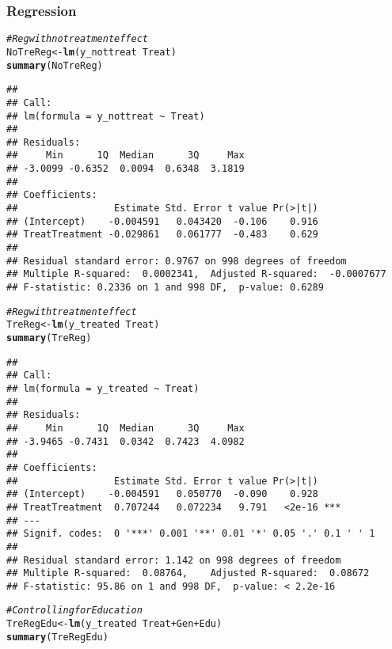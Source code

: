 \documentclass[11pt, a4paper]{article}\usepackage[]{graphicx}\usepackage[]{color}
\makeatletter
\newcommand{\hlcom}[1]{\textcolor[rgb]{0.678,0.584,0.686}{\textit{#1}}}%
\newcommand{\hlopt}[1]{\textcolor[rgb]{0,0,0}{#1}}%
\newcommand{\hlstd}[1]{\textcolor[rgb]{0.345,0.345,0.345}{#1}}%
\newcommand{\hlkwb}[1]{\textcolor[rgb]{0.69,0.353,0.396}{#1}}%
\newcommand{\hlkwd}[1]{\textcolor[rgb]{0.737,0.353,0.396}{\textbf{#1}}}%
\newenvironment{kframe}{%
 \def\at@end@of@kframe{}%
 \ifinner\ifhmode%
  \def\at@end@of@kframe{\end{minipage}}%
  \begin{minipage}{\columnwidth}%
 \fi\fi%
 \def\FrameCommand##1{\hskip\@totalleftmargin \hskip-\fboxsep
 \colorbox{shadecolor}{##1}\hskip-\fboxsep
     \hskip-\linewidth \hskip-\@totalleftmargin \hskip\columnwidth}%
 \MakeFramed {\advance\hsize-\width
   \@totalleftmargin\z@ \linewidth\hsize
   \@setminipage}}%
 {\par\unskip\endMakeFramed%
 \at@end@of@kframe}
\newenvironment{knitrout}{}{} %
\makeatother
\begin{document}
\clearpage

    \subsubsection{Regression}

\begin{knitrout}
\color{fgcolor}\begin{kframe}
\begin{alltt}
  \hlcom{#Reg with no treatment effect}
  \hlstd{NoTreReg} \hlkwb{<-} \hlkwd{lm}\hlstd{(y_nottreat} \hlopt{~} \hlstd{Treat)}
  \hlkwd{summary}\hlstd{(NoTreReg)}
\end{alltt}
\begin{verbatim}
## 
## Call:
## lm(formula = y_nottreat ~ Treat)
## 
## Residuals:
##     Min      1Q  Median      3Q     Max 
## -3.0099 -0.6352  0.0094  0.6348  3.1819 
## 
## Coefficients:
##                 Estimate Std. Error t value Pr(>|t|)
## (Intercept)    -0.004591   0.043420  -0.106    0.916
## TreatTreatment -0.029861   0.061777  -0.483    0.629
## 
## Residual standard error: 0.9767 on 998 degrees of freedom
## Multiple R-squared:  0.0002341,	Adjusted R-squared:  -0.0007677 
## F-statistic: 0.2336 on 1 and 998 DF,  p-value: 0.6289
\end{verbatim}
\begin{alltt}
  \hlcom{#Reg with treatment effect}
  \hlstd{TreReg} \hlkwb{<-} \hlkwd{lm}\hlstd{(y_treated} \hlopt{~} \hlstd{Treat)}
  \hlkwd{summary}\hlstd{(TreReg)}
\end{alltt}
\begin{verbatim}
## 
## Call:
## lm(formula = y_treated ~ Treat)
## 
## Residuals:
##     Min      1Q  Median      3Q     Max 
## -3.9465 -0.7431  0.0342  0.7423  4.0982 
## 
## Coefficients:
##                 Estimate Std. Error t value Pr(>|t|)    
## (Intercept)    -0.004591   0.050770  -0.090    0.928    
## TreatTreatment  0.707244   0.072234   9.791   <2e-16 ***
## ---
## Signif. codes:  0 '***' 0.001 '**' 0.01 '*' 0.05 '.' 0.1 ' ' 1
## 
## Residual standard error: 1.142 on 998 degrees of freedom
## Multiple R-squared:  0.08764,	Adjusted R-squared:  0.08672 
## F-statistic: 95.86 on 1 and 998 DF,  p-value: < 2.2e-16
\end{verbatim}
\begin{alltt}
  \hlcom{#Controlling for Education}
  \hlstd{TreRegEdu} \hlkwb{<-} \hlkwd{lm}\hlstd{(y_treated} \hlopt{~} \hlstd{Treat} \hlopt{+} \hlstd{Gen} \hlopt{+} \hlstd{Edu)}
  \hlkwd{summary}\hlstd{(TreRegEdu)}

\end{alltt}
\end{kframe}
\end{knitrout}
\end{document}
